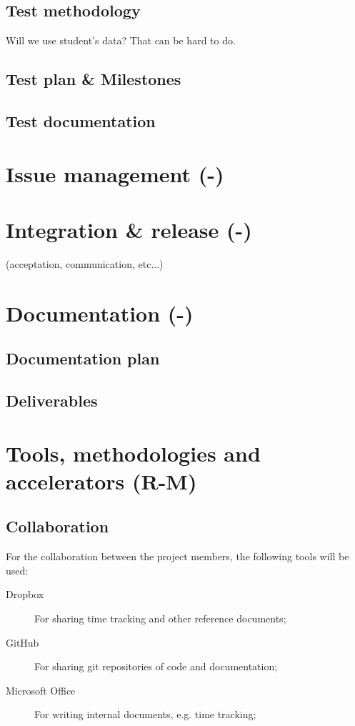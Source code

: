 \documentclass[a4paper,12pt,abstracton,titlepage]{scrartcl}
\begin{document}
\subsection{Test methodology}
Will we use student's data? That can be hard to do.

\subsection{Test plan \& Milestones}
\lipsum[1]
\subsection{Test documentation}
\lipsum[1]

\section{Issue management (-)}
\label{sec:issue-management}

\section{Integration \& release (-)}
\label{sec:integration-release}
(acceptation, communication, etc...)

\section{Documentation (-)}
\label{sec:documentation}
\subsection{Documentation plan}
\lipsum[1]
\subsection{Deliverables}
\lipsum[1]

\section{Tools, methodologies and accelerators (R-M)}
\label{sec:tools-methodologies}
\subsection{Collaboration}
For the collaboration between the project members, the following tools will be used:
\begin{description}
	\item[Dropbox] For sharing time tracking and other reference documents;
	\item[GitHub] For sharing git repositories of code and documentation;
	\item[Microsoft Office] For writing internal documents, e.g. time tracking;
\end{description}
\end{document}
